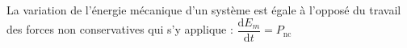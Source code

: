 ﻿\documentclass[a4paper]{article}
\begin{document}
\pagestyle{fancy}
\fancyhf{}
\setlength{\headheight}{15pt}

\begin{center}
	\large{}
\end{center}


La variation de l'énergie mécanique d'un système est égale à l'opposé du travail des forces non conservatives qui s'y applique : \(\dfrac{\mathrm{d} E_m}{\mathrm{d} t}=P_{\text{nc}}\)
\begin{center}
\end{center}
\end{document}
